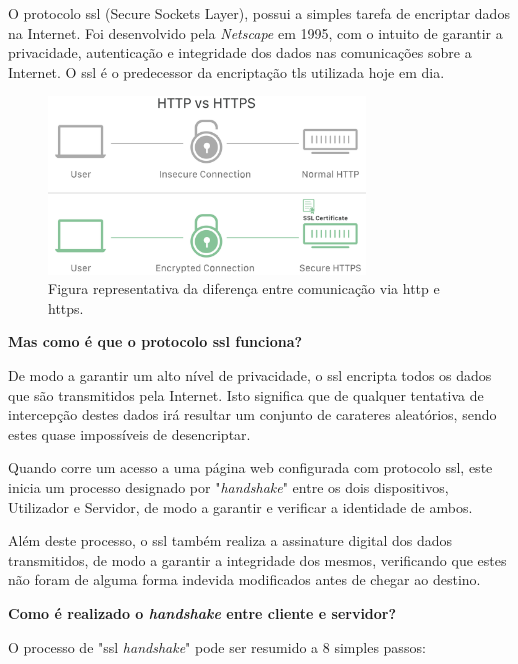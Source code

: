 O protocolo \gls{ssl} (Secure Sockets Layer), possui a simples tarefa de encriptar dados na Internet. Foi desenvolvido pela \emph{Netscape} em 1995, com o intuito de garantir a privacidade, autenticação e integridade dos dados nas comunicações sobre a Internet. O \gls{ssl} é o predecessor da encriptação \gls{tls} utilizada hoje em dia.

\begin{figure}[h]
    \centering
    \includegraphics[width=0.75\textwidth]{img/ssl/comparison.png}
    \caption{Figura representativa da diferença entre comunicação via \gls{http} e \gls{https}.}
\end{figure}

\vspace{5mm}
\textbf{Mas como é que o protocolo \gls{ssl} funciona?}

De modo a garantir um alto nível de privacidade, o \gls{ssl} encripta todos os dados que são transmitidos pela Internet. Isto significa que de qualquer tentativa de intercepção destes dados irá resultar um conjunto de carateres aleatórios, sendo estes quase impossíveis de desencriptar.

Quando corre um acesso a uma página web configurada com protocolo \gls{ssl}, este inicia um processo designado por "\emph{handshake}" entre os dois dispositivos, Utilizador e Servidor, de modo a garantir e verificar a identidade de ambos.

Além deste processo, o \gls{ssl} também realiza a assinature digital dos dados transmitidos, de modo a garantir a integridade dos mesmos, verificando que estes não foram de alguma forma indevida modificados antes de chegar ao destino.

\cleardoublepage
\textbf{Como é realizado o \emph{handshake} entre cliente e servidor?}

O processo de "\gls{ssl} \emph{handshake}" pode ser resumido a 8 simples passos:

